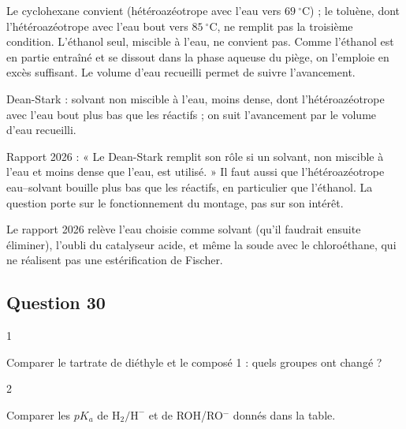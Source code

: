 \documentclass[11pt,a4paper]{article}
\begin{document}
Le cyclohexane convient (hétéroazéotrope avec l'eau vers \(69\ ^\circ\)C) ; le toluène, dont l'hétéroazéotrope avec l'eau bout vers \(85\ ^\circ\)C, ne remplit pas la troisième condition. L'éthanol seul, miscible à l'eau, ne convient pas. Comme l'éthanol est en partie entraîné et se dissout dans la phase aqueuse du piège, on l'emploie en excès suffisant. Le volume d'eau recueilli permet de suivre l'avancement.

\begin{methode}

Dean-Stark : solvant non miscible à l'eau, moins dense, dont l'hétéroazéotrope avec l'eau bout plus bas que les réactifs ; on suit l'avancement par le volume d'eau recueilli.

\end{methode}

\begin{jury}

Rapport 2026 : « Le Dean-Stark remplit son rôle si un solvant, non miscible à l'eau et moins dense que l'eau, est utilisé. » Il faut aussi que l'hétéroazéotrope eau--solvant bouille plus bas que les réactifs, en particulier que l'éthanol. La question porte sur le fonctionnement du montage, pas sur son intérêt.

\end{jury}

\begin{piege}

Le rapport 2026 relève l'eau choisie comme solvant (qu'il faudrait ensuite éliminer), l'oubli du catalyseur acide, et même la soude avec le chloroéthane, qui ne réalisent pas une estérification de Fischer.

\end{piege}

\hypertarget{question-30}{%
\subsection{Question 30}\label{question-30}}

\begin{indication}{1}

Comparer le tartrate de diéthyle et le composé 1 : quels groupes ont changé ?

\end{indication}

\begin{indication}{2}

Comparer les \(pK_a\) de \(\mathrm{H_2/H^-}\) et de ROH/RO\(^-\) donnés dans la table.

\end{indication}
\end{document}
